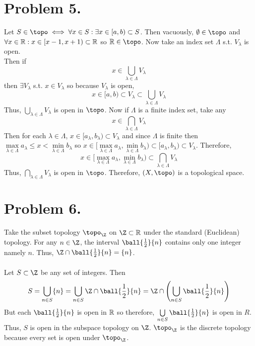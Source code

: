 \documentclass[12pt]{extarticle}
\begin{document}
\section*{Problem 5.}

Let $S \in \topo \iff \forall x \in S : \exists x \in [a, b) \subset S$. Then vacuously, $\emptyset \in \topo$ and \\ $\forall x \in \mathbb{R} : x \in [x - 1, x + 1) \subset \mathbb{R}$ so  $\R \in \topo$. Now take an index set $\Lambda$ s.t. $V_\lambda$ is open. \\ Then if \[x \in \bigcup\limits_{\lambda \in \Lambda} V_\lambda \] then $\exists V_\lambda$ s.t. $x \in V_\lambda$ so because $V_\lambda$ is open, \[x \in [a, b) \subset V_\lambda \subset \bigcup\limits_{\lambda \in \Lambda} V_\lambda \]
Thus, $\bigcup\limits_{\lambda \in \Lambda} V_\lambda$ is open in $\topo$. Now if $\Lambda$ is a finite index set, take any \[x \in \bigcap\limits_{\lambda \in \Lambda} V_\lambda \]
Then for each $\lambda \in \Lambda$, $x \in [a_\lambda, b_\lambda ) \subset V_\lambda$ and since $\Lambda$ is finite then $\max\limits_{\lambda \in \Lambda}{a_\lambda} \le x < \min\limits_{\lambda \in \Lambda}{b_\lambda}$  so $x \in [\max\limits_{\lambda \in \Lambda}{a_\lambda}, \min\limits_{\lambda \in \Lambda}{b_\lambda}) \subset [a_\lambda, b_\lambda) \subset V_\lambda$. Therefore, \[ x \in [\max\limits_{\lambda \in \Lambda}{a_\lambda}, \min\limits_{\lambda \in \Lambda}{b_\lambda}) \subset \bigcap\limits_{\lambda \in \Lambda} V_\lambda \] Thus, $\bigcap\limits_{\lambda \in \Lambda} V_\lambda$ is open in $\topo$.
Therefore, $\left(X, \topo \right)$ is a topological space.

\section*{Problem 6.}

Take the subset topology $\topo_\Z$ on $\Z \subset \R$ under the standard (Euclidean) topology. For any $n \in \Z$, the interval $\ball{\frac{1}{2}}{n}$ contains only one integer namely $n$. Thus, $\Z \cap \ball{\frac{1}{2}}{n} = \{ n \}$. \\ \\

Let $S \subset \Z$ be any set of integers. Then \[S = \bigcup\limits_{n \in S} \{ n \} = \bigcup\limits_{n \in S} \Z \cap  \ball{\frac{1}{2}}{n} = \Z \cap \left(\bigcup\limits_{n \in S}\ball{\frac{1}{2}}{n} \right) \]
But each $\ball{\frac{1}{2}}{n}$ is open in $\mathbb{R}$ so therefore, $\bigcup\limits_{n \in S}\ball{\frac{1}{2}}{n}$ is open in $R$. Thus, $S$ is open in the subspace topology on $\Z$. $\topo_\Z$ is the discrete topology because every set is open under $\topo_\Z$.
\end{document}
